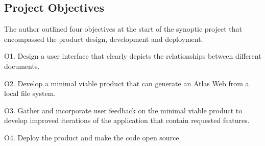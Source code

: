 \documentclass{article}
\begin{document}
\subsection{Project Objectives}

The author outlined four objectives at the start of the synoptic project that encompassed the product design, development and deployment.

O1. Design a user interface that clearly depicts the relationships between different documents.

O2. Develop a minimal viable product that can generate an Atlas Web from a local file system.

O3. Gather and incorporate user feedback on the minimal viable product to develop improved iterations of the application that contain requested features.

O4. Deploy the product and make the code open source. 
\end{document}
